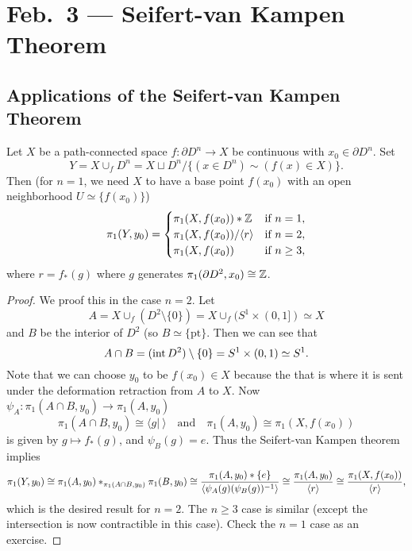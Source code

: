 \chapter{Feb.~3 --- Seifert-van Kampen Theorem}

\section{Applications of the Seifert-van Kampen Theorem}
\begin{theorem}
  Let $X$ be a path-connected space
  $f : \partial D^n \to X$ be continuous with
  $x_0 \in \partial D^n$. Set
  \[
    Y = X \cup_f D^n = X \sqcup D^n / \{(x \in D^n) \sim (f(x) \in X)\}.
  \]
  Then (for $n = 1$, we need $X$ to have a
  base point $f(x_0)$ with an open neighborhood
  $U \simeq \{f(x_0)\}$)
  \[
    \pi_1(Y, y_0) =
    \begin{cases}
      \pi_1(X, f(x_0)) * \mathbb{Z} & \text{if $n = 1$}, \\
      \pi_1(X, f(x_0)) / \langle r \rangle & \text{if $n = 2$}, \\
      \pi_1(X, f(x_0)) & \text{if $n \geq 3$},
    \end{cases}
  \]
  where $r = f_*(g)$ where $g$ generates
  $\pi_1(\partial D^2, x_0) \cong \mathbb{Z}$.
\end{theorem}

\begin{proof}
  We proof this in the case $n = 2$. Let
  \[
    A = X \cup_f (D^2 \setminus \{0\})
    = X \cup_f (S^1 \times (0, 1]) \simeq X
  \]
  and $B$ be the interior of $D^2$ (so
  $B \simeq \{\text{pt}\}$. Then we can see that
  \[
    A \cap B = (\operatorname{int} D^2) \setminus \{0\}
    = S^1 \times (0, 1) \simeq S^1.
  \]
  Note that we can choose $y_0$ to be $f(x_0) \in X$
  because the that is where it is sent under the
  deformation retraction from $A$ to $X$. Now
  $\psi_A : \pi_1(A \cap B, y_0) \to \pi_1(A, y_0)$
  \[\pi_1(A \cap B, y_0) \cong \langle g | \ \rangle
  \quad \text{and} \quad \pi_1(A, y_0) \cong \pi_1(X, f(x_0))\]
  is given by $g \mapsto f_*(g)$, and $\psi_B(g) = e$.
  Thus the Seifert-van Kampen theorem implies
  \[
    \pi_1(Y, y_0) \cong \pi_1(A, y_0) *_{\pi_1(A \cap B, y_0)} \pi_1(B, y_0) \\
    \cong \frac{\pi_1(A, y_0) * \{e\}}{\langle \psi_A(g) (\psi_B(g))^{-1} \rangle}
    \cong \frac{\pi_1(A, y_0)}{\langle r \rangle}
    \cong \frac{\pi_1(X, f(x_0))}{\langle r \rangle},
  \]
  which is the desired result for $n = 2$. The
  $n \ge 3$ case is similar (except the intersection
  is now contractible in this case). Check the $n = 1$
  case as an exercise.
\end{proof}

